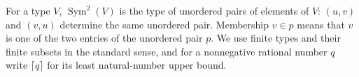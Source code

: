 \begin{definition}
For a type $V$, $\operatorname{Sym}^2(V)$ is the type of unordered pairs of
elements of $V$: $(u,v)$ and $(v,u)$ determine the same unordered pair.
Membership $v\in p$ means that $v$ is one of the two entries of the unordered
pair $p$.  We use finite types and their finite subsets in the standard sense,
and for a nonnegative rational number $q$ write $\lceil q\rceil$ for its
least natural-number upper bound.
\end{definition}
